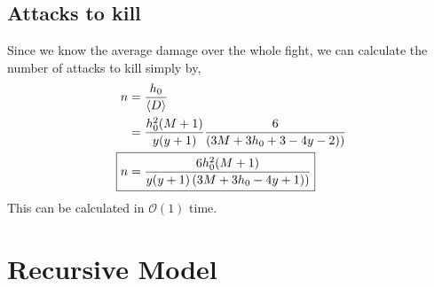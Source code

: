 
		\subsection{Attacks to kill}
			Since we know the average damage over the whole fight, we can calculate the number of attacks to kill simply by,
			\begin{align}
				n &= \frac{h_0}{\langle D \rangle} \\
				&= \frac{h^2_0(M+1)}{y(y+1)}\frac{6}{\left(3M+3h_0+3-4y-2) \right)} \\
				\Aboxed{n &= \frac{6h^2_0(M+1)}{y(y+1)\left(3M+3h_0-4y+1) \right)}}
			\end{align}
			This can be calculated in $\mathcal{O}(1)$ time.

	\section{Recursive Model}\label{sec:average_damage}
